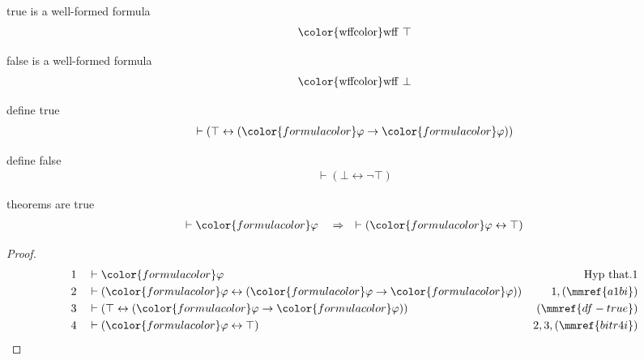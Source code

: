 \begin{lemma} true is a well-formed formula
\begin{align}
{\rm\color{wffcolor} wff~} \top\label{wtrue}
\end{align}
\end{lemma}

\begin{lemma} false is a well-formed formula
\begin{align}
{\rm\color{wffcolor} wff~} \bot\label{wfalse}
\end{align}
\end{lemma}

\begin{lemma} define true
\begin{align}
\vdash ( \top \leftrightarrow ( {\color{formulacolor}\varphi} \rightarrow
    {\color{formulacolor}\varphi} ) )\label{df-true}
\end{align}
\end{lemma}

\begin{lemma} define false
\begin{align}
\vdash ( \bot \leftrightarrow \lnot \top )\label{df-false}
\end{align}
\end{lemma}

\begin{lemma} theorems are true
\begin{align}
\vdash {\color{formulacolor}\varphi}\quad\Rightarrow\quad \vdash (
    {\color{formulacolor}\varphi} \leftrightarrow \top )\label{bl.that}
\end{align}
\end{lemma}

\begin{proof}
\begin{align}
  1 && & \vdash {\color{formulacolor}\varphi}&\text{Hyp~that.1}\notag%
  \\ 2 && & \vdash ( {\color{formulacolor}\varphi} \leftrightarrow (
      {\color{formulacolor}\varphi} \rightarrow
      {\color{formulacolor}\varphi} )
      )&1,(\mmref{a1bi})\notag
  \\ 3 && & \vdash ( \top \leftrightarrow ( {\color{formulacolor}\varphi}
      \rightarrow {\color{formulacolor}\varphi} )
      )&(\mmref{df-true})\notag
  \\ 4 && & \vdash ( {\color{formulacolor}\varphi} \leftrightarrow \top
      )&2,3,(\mmref{bitr4i})\notag
\end{align}
\end{proof}

